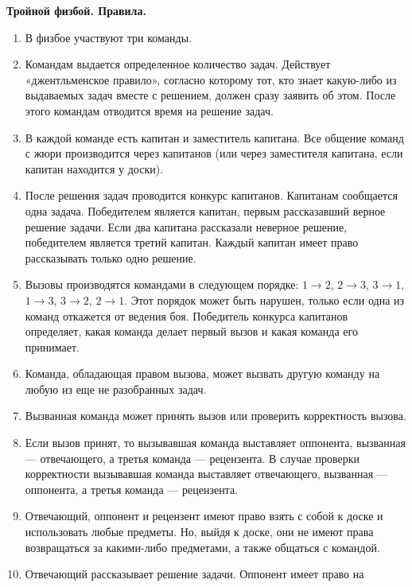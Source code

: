 \documentclass[11pt]{article}
\begin{document}
\begin{center}
  \Large{\textbf{Тройной физбой. Правила.}}
\end{center}

\begin{enumerate}
\setlength{\itemsep}{-2mm}
\item В физбое участвуют три команды.
\item Командам выдается определенное количество задач. Действует
  «джентльменское правило», согласно которому тот, кто знает
  какую-либо из выдаваемых задач вместе с решением, должен сразу
  заявить об этом. После этого командам отводится время на решение
  задач.
\item В каждой команде есть капитан и заместитель капитана. Все
  общение команд с жюри производится через капитанов (или через
  заместителя капитана, если капитан находится у доски).
\item После решения задач проводится конкурс капитанов. Капитанам
  сообщается одна задача. Победителем является капитан, первым
  рассказавший верное решение задачи. Если два капитана рассказали
  неверное решение, победителем является третий капитан. Каждый
  капитан имеет право рассказывать только одно решение.
\item Вызовы производятся командами в следующем порядке: $1
  \rightarrow 2$, $2 \rightarrow3$, $3 \rightarrow 1$, $1
  \rightarrow 3$, $3 \rightarrow 2$, $2 \rightarrow 1$. Этот
  порядок может быть нарушен, только если одна из команд откажется от
  ведения боя. Победитель конкурса капитанов определяет, какая команда
  делает первый вызов и какая команда его принимает.
\item Команда, обладающая правом вызова, может вызвать другую команду
  на любую из еще не разобранных задач.
\item Вызванная команда может принять вызов или проверить корректность
  вызова.
\item Если вызов принят, то вызывавшая команда выставляет оппонента,
  вызванная --- отвечающего, а третья команда --- рецензента. В случае
  проверки корректности вызывавшая команда выставляет отвечающего,
  вызванная --- оппонента, а третья команда --- рецензента.
\item Отвечающий, оппонент и рецензент имеют право взять с собой к
  доске и использовать любые предметы. Но, выйдя к доске, они не имеют
  права возвращаться за какими-либо предметами, а также общаться с
  командой.
\item Отвечающий рассказывает решение задачи. Оппонент имеет право на

\end{enumerate}
\end{document}
